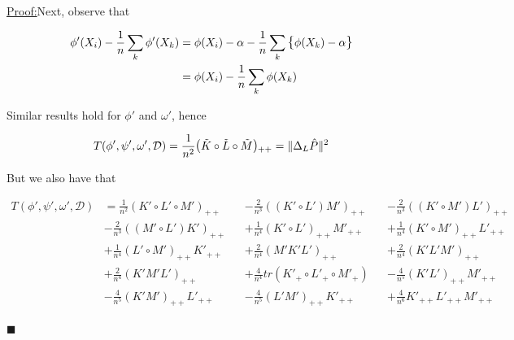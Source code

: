 \documentclass[12pt]{article}
\newenvironment{claimproof}[1]{\par\noindent\underline{Proof:}\space#1}{\hfill $\blacksquare$}
\numberwithin{claim}{section}
\numberwithin{lemma}{section}
\numberwithin{theorem}{section}
\begin{document}
\begin{claimproof}
Next, observe that

\begin{align*}
\phi'(X_i) - \frac{1}{n} \sum_k \phi'(X_k) &= \phi(X_i) - \alpha - \frac{1}{n} \sum_k \mathlarger{\{} \phi(X_k) - \alpha\mathlarger{\}} \\
& = \phi(X_i) - \frac{1}{n} \sum_k \phi(X_k)
\end{align*}

Similar results hold for $\phi'$ and $\omega'$, hence

\begin{align*}
T(\phi',\psi',\omega',\mathcal{D}) &= \frac{1}{n^2}\mathlarger{(}\tilde{K}\circ\tilde{L}\circ\tilde{M}\mathlarger{)}_{++} =\|\Delta_L \hat{P}\|^2 \\
\end{align*}

But we also have that

\begin{align*}
T(\phi',\psi',\omega',\mathcal{D}) &= \frac{1}{n^2}(K' \circ L'\circ M')_{++} &&-
\frac{2}{n^3}((K'\circ L') M')_{++} & &- 
\frac{2}{n^3}((K' \circ M') L')_{++} \\&- 
\frac{2}{n^3}((M' \circ L') K')_{++} &&+ 
\frac{1}{n^4}(K' \circ L')_{++} M'_{++} &&+ 
\frac{1}{n^4}(K' \circ M')_{++} L'_{++} \\&+ 
\frac{1}{n^4}(L' \circ M')_{++} K'_{++} &&+ 
\frac{2}{n^4}(M'K'L')_{++} &&+ 
\frac{2}{n^4}(K'L'M')_{++} \\&+ 
\frac{2}{n^4}(K'M'L')_{++} &&+ 
\frac{4}{n^4}tr(K'_+ \circ L'_+ \circ M'_+) &&-
\frac{4}{n^5}(K' L')_{++} M'_{++} \\& - 
\frac{4}{n^5}(K'M')_{++}L'_{++} &&- 
\frac{4}{n^5}(L'M')_{++} K'_{++} &&+
\frac{4}{n^6}K'_{++} L'_{++} M'_{++} \\
\end{align*}


\end{claimproof}
\end{document}
